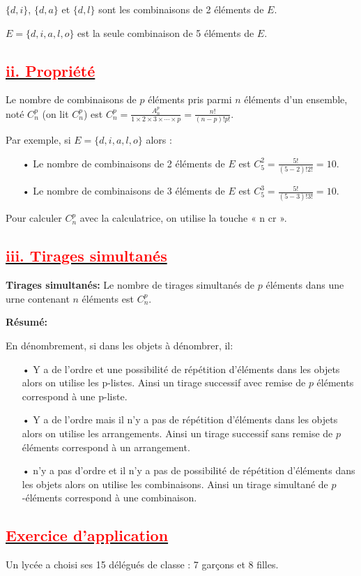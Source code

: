 \documentclass[12pt]{article}
\begin{document}
$\{d, i\}$, $\{d, a\}$ et $\{d, l\}$ sont les combinaisons de 2 éléments de $E$.

$E = \{d, i, a, l, o\}$ est la seule combinaison de 5 éléments de $E$.
\subsection*{\underline{\textbf{\textcolor{red}{ii. Propriété }}}}
Le nombre de combinaisons de $p$ éléments pris parmi $n$ éléments d'un ensemble, noté $C_{n}^{p}$ (on lit $C_{n}^{p}$) est $C_{n}^{p} = \frac{A_{n}^{p}}{1 \times 2 \times 3 \times \cdots \times p}=\frac{n!}{(n-p)!p!}$.

Par exemple, si $E = \{d, i, a, l, o\}$ alors :
\begin{itemize}
  \item[•] Le nombre de combinaisons de 2 éléments de $E$ est $C_{5}^{2} = \frac{5!}{(5-2)!2!} = 10$.
  \item[•] Le nombre de combinaisons de 3 éléments de $E$ est $C_{5}^{3} = \frac{5!}{(5-3)!3!} = 10$.
\end{itemize}
Pour calculer $C_{n}^{p}$ avec la calculatrice, on utilise la touche « n cr ».
\subsection*{\underline{\textbf{\textcolor{red}{iii. Tirages simultanés}}}}
\textbf{Tirages simultanés:} Le nombre de tirages simultanés de $p$ éléments dans une urne contenant $n$ éléments est $C_{n}^{p}$.

\textbf{Résumé:}

En dénombrement, si dans les objets à dénombrer, il:
\begin{itemize}
    \item[•] Y a de l’ordre et une possibilité de répétition d’éléments dans les objets alors on utilise les p-listes. Ainsi un tirage successif avec remise de $p$ éléments correspond à une p-liste.
    \item[•] Y a de l’ordre mais il n’y a pas de répétition d’éléments dans les objets alors on utilise les arrangements. Ainsi un tirage successif sans remise de $p$ éléments correspond à un arrangement.
    \item[•] n’y a pas d’ordre et il n’y a pas de possibilité de répétition d’éléments dans les objets alors on utilise les combinaisons. Ainsi un tirage simultané de $p$-éléments correspond à une combinaison.
\end{itemize}
\subsection*{\underline{\textbf{\textcolor{red}{Exercice d’application}}}}
Un lycée a choisi ses 15 délégués de classe : 7 garçons et 8 filles.
\end{document}
